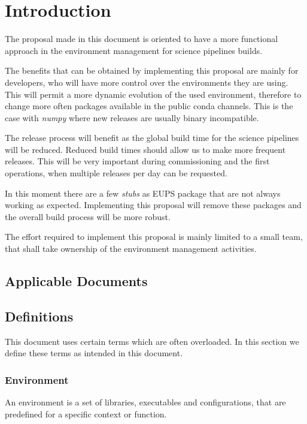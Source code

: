 \section{Introduction} \label{sec:intro}

The proposal made in this document is oriented to have a more functional approach in the environment management for science pipelines builds.

The benefits that can be obtained by implementing this proposal are mainly for developers, who will have more control over the environments they are using. 
This will permit a more dynamic evolution of the used environment, therefore to change more often packages available in the public conda channels. This is the case with \textit{numpy} where new releases are usually binary incompatible.

The release process will  benefit as the global build time for the science pipelines  will be reduced. 
Reduced build times should allow us to make more frequent releases. 
This will be very important during commissioning and the first operations, when multiple releases per day can be requested.

In this moment there are a few \textit{stubs} as EUPS package that are not always working as expected.
Implementing this proposal will remove these packages and the overall build process will be more robust.

The effort required to implement this proposal is mainly limited to a small team, that shall take ownership of the environment management activities.


\subsection{Applicable Documents}


\subsection{Definitions}

This document uses certain terms which are often overloaded. In this section we define these terms  as intended in this document.

\subsubsection{Environment} \label{sec:envdef}

An environment is a set of libraries, executables and configurations, that are predefined for a specific context or function.

